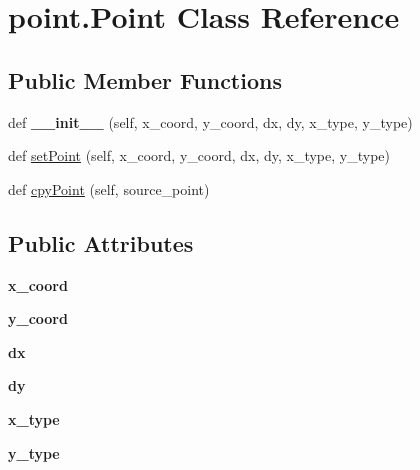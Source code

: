 \hypertarget{classpoint_1_1Point}{}\section{point.\+Point Class Reference}
\label{classpoint_1_1Point}
\subsection*{Public Member Functions}
\begin{DoxyCompactItemize}
\item 
def {\bfseries \+\_\+\+\_\+init\+\_\+\+\_\+} (self, x\+\_\+coord, y\+\_\+coord, dx, dy, x\+\_\+type, y\+\_\+type)\hypertarget{classpoint_1_1Point_ad828850bdd90bf5a031f787e15a67f22}{}\label{classpoint_1_1Point_ad828850bdd90bf5a031f787e15a67f22}

\item 
def \hyperlink{classpoint_1_1Point_a5c98be41b46b735c986f0c0bd0f296e2}{set\+Point} (self, x\+\_\+coord, y\+\_\+coord, dx, dy, x\+\_\+type, y\+\_\+type)
\item 
def \hyperlink{classpoint_1_1Point_a24b1b672d23a397aad796aaa9c1e5f61}{cpy\+Point} (self, source\+\_\+point)
\end{DoxyCompactItemize}
\subsection*{Public Attributes}
\begin{DoxyCompactItemize}
\item 
{\bfseries x\+\_\+coord}\hypertarget{classpoint_1_1Point_ac8519ea666c81f170f0be398c40aad1f}{}\label{classpoint_1_1Point_ac8519ea666c81f170f0be398c40aad1f}

\item 
{\bfseries y\+\_\+coord}\hypertarget{classpoint_1_1Point_a9b956d382d3a6db5a39aa5895f9a5ab8}{}\label{classpoint_1_1Point_a9b956d382d3a6db5a39aa5895f9a5ab8}

\item 
{\bfseries dx}\hypertarget{classpoint_1_1Point_ae686cba0fd4073a678fbe82848477a2d}{}\label{classpoint_1_1Point_ae686cba0fd4073a678fbe82848477a2d}

\item 
{\bfseries dy}\hypertarget{classpoint_1_1Point_a828d51f1faabddb60a6eb4a31a024de6}{}\label{classpoint_1_1Point_a828d51f1faabddb60a6eb4a31a024de6}

\item 
{\bfseries x\+\_\+type}\hypertarget{classpoint_1_1Point_af62100393bbf1847f68d0cb76c3f9700}{}\label{classpoint_1_1Point_af62100393bbf1847f68d0cb76c3f9700}

\item 
{\bfseries y\+\_\+type}\hypertarget{classpoint_1_1Point_a37d1b32204ade133d4da0c7826cfe9f9}{}\label{classpoint_1_1Point_a37d1b32204ade133d4da0c7826cfe9f9}

\end{DoxyCompactItemize}


